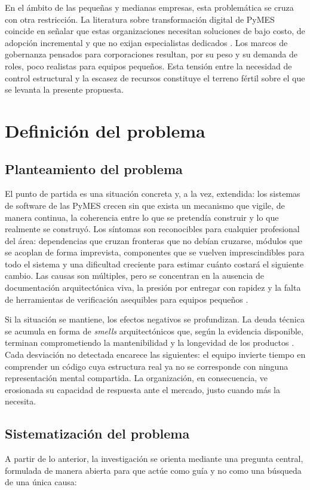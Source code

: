 En el ámbito de las pequeñas y medianas empresas, esta problemática se cruza con otra restricción. La literatura sobre transformación digital de PyMES coincide en señalar que estas organizaciones necesitan soluciones de bajo costo, de adopción incremental y que no exijan especialistas dedicados \citep{Patricio2025, Jamil2026}. Los marcos de gobernanza pensados para corporaciones resultan, por su peso y su demanda de roles, poco realistas para equipos pequeños. Esta tensión entre la necesidad de control estructural y la escasez de recursos constituye el terreno fértil sobre el que se levanta la presente propuesta.

\section{Definición del problema}

\subsection{Planteamiento del problema}
El punto de partida es una situación concreta y, a la vez, extendida: los sistemas de software de las PyMES crecen sin que exista un mecanismo que vigile, de manera continua, la coherencia entre lo que se pretendía construir y lo que realmente se construyó. Los síntomas son reconocibles para cualquier profesional del área: dependencias que cruzan fronteras que no debían cruzarse, módulos que se acoplan de forma imprevista, componentes que se vuelven imprescindibles para todo el sistema y una dificultad creciente para estimar cuánto costará el siguiente cambio. Las causas son múltiples, pero se concentran en la ausencia de documentación arquitectónica viva, la presión por entregar con rapidez y la falta de herramientas de verificación asequibles para equipos pequeños \citep{Hamed2023, Klein2022}.

Si la situación se mantiene, los efectos negativos se profundizan. La deuda técnica se acumula en forma de \textit{smells} arquitectónicos que, según la evidencia disponible, terminan comprometiendo la mantenibilidad y la longevidad de los productos \citep{SasAvgeriou, Jolak2025}. Cada desviación no detectada encarece las siguientes: el equipo invierte tiempo en comprender un código cuya estructura real ya no se corresponde con ninguna representación mental compartida. La organización, en consecuencia, ve erosionada su capacidad de respuesta ante el mercado, justo cuando más la necesita.

\subsection{Sistematización del problema}
A partir de lo anterior, la investigación se orienta mediante una pregunta central, formulada de manera abierta para que actúe como guía y no como una búsqueda de una única causa:

